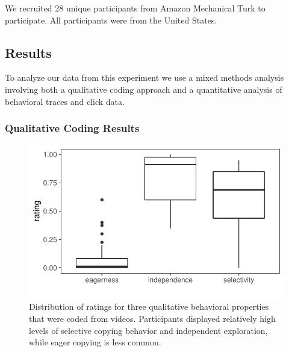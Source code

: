 \documentclass[12pt,letterpaper]{article}
\begin{document}
We recruited 28 unique participants from Amazon Mechanical Turk to participate.
All participants were from the United
States.

\subsection{Results}


To analyze our data from this experiment we use a mixed methods analysis involving both a qualitative coding approach and a quantitative analysis of behavioral traces and click data. 



\subsubsection{Qualitative Coding Results}

\begin{figure}[t!]
    \centering
    \includegraphics[width=0.9\linewidth]{figures/coding.pdf}
    \caption{Distribution of ratings for three qualitative behavioral properties that were coded from videos. Participants displayed relatively high levels of selective copying behavior and independent exploration, while eager copying is less common.}
    \label{fig:selective}
\end{figure}
\end{document}
